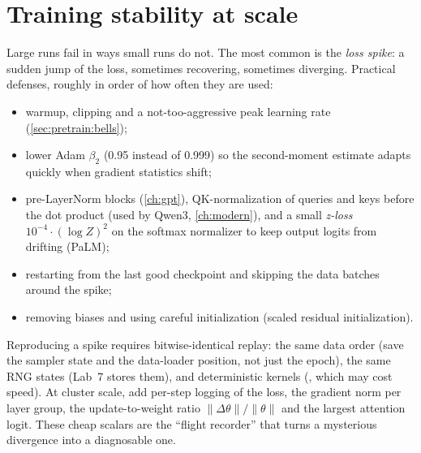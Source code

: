 \section{Training stability at scale}\label{sec:pretrain:stability}

Large runs fail in ways small runs do not. The most common is the \emph{loss spike}: a sudden
jump of the loss, sometimes recovering, sometimes diverging. Practical defenses, roughly in
order of how often they are used:
\begin{itemize}
\item warmup, clipping and a not-too-aggressive peak learning rate (\cref{sec:pretrain:bells});
\item lower Adam $\beta_2$ (0.95 instead of 0.999) so the second-moment estimate adapts quickly
  when gradient statistics shift;
\item pre-LayerNorm blocks (\cref{ch:gpt}), QK-normalization of queries and keys before the dot
  product (used by Qwen3, \cref{ch:modern}), and a small \emph{z-loss} $10^{-4}\cdot(\log Z)^2$ on
  the softmax normalizer to keep output logits from drifting (PaLM);
\item restarting from the last good checkpoint and skipping the data batches around the spike;
\item removing biases and using careful initialization (scaled residual initialization).
\end{itemize}

\begin{systemslens}
Reproducing a spike requires bitwise-identical replay: the same data order (save the sampler
state and the data-loader position, not just the epoch), the same RNG states (Lab~7 stores
them), and deterministic kernels (, which may
cost speed). At cluster scale, add per-step logging of the loss, the gradient norm per layer
group, the update-to-weight ratio $\|\Delta\theta\|/\|\theta\|$ and the largest attention logit.
These cheap scalars are the ``flight recorder'' that turns a mysterious divergence into a
diagnosable one.
\end{systemslens}

